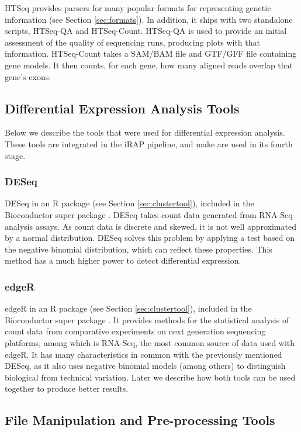 HTSeq provides parsers for many popular formats for representing genetic
information (see Section \ref{sec:formats}). In addition, it ships with two
standalone scripts, HTSeq-QA and HTSeq-Count. HTSeq-QA is used to provide an
initial assessment of the quality of sequencing runs, producing plots with that
information. HTSeq-Count takes a SAM/BAM file and GTF/GFF file containing gene
models. It then counts, for each gene, how many aligned reads overlap that
gene's exons.

\subsection{Differential Expression Analysis Tools}

Below we describe the tools that were used for differential expression analysis.
These tools are integrated in the iRAP pipeline, and make are used in its fourth
stage.

\subsubsection*{DESeq}

DESeq in an R package (see Section \ref{sec:clustertool}), included in the
Bioconductor super package \cite{20979621}. DESeq takes count data generated
from RNA-Seq analysis assays. As count data is discrete and skewed, it is not
well approximated by a normal distribution. DESeq solves this problem by
applying a test based on the negative binomial distribution, which can reflect
these properties. This method has a much higher power to detect differential
expression.

\subsubsection*{edgeR}

edgeR in an R package (see Section \ref{sec:clustertool}), included in the
Bioconductor super package \cite{robinson2010edger}. It provides methods for the
statistical analysis of count data from comparative experiments on next
generation sequencing platforms, among which is RNA-Seq, the most common source
of data used with edgeR. It has many characteristics in common with the
previously mentioned DESeq, as it also uses negative binomial models (among
others) to distinguish biological from technical variation. Later we describe
how both tools can be used together to produce better results.

\subsection{File Manipulation and Pre-processing Tools}

